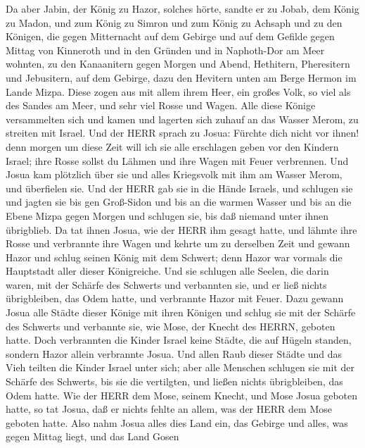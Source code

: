  Da aber Jabin, der König zu Hazor, solches hörte, sandte er
zu Jobab, dem König zu Madon, und zum König zu Simron und zum König zu
Achsaph  und zu den Königen, die gegen Mitternacht auf dem
Gebirge und auf dem Gefilde gegen Mittag von Kinneroth und in den
Gründen und in Naphoth-Dor am Meer wohnten,  zu den
Kanaanitern gegen Morgen und Abend, Hethitern, Pheresitern und
Jebusitern, auf dem Gebirge, dazu den Hevitern unten am Berge Hermon im
Lande Mizpa.  Diese zogen aus mit allem ihrem Heer, ein
großes Volk, so viel als des Sandes am Meer, und sehr viel Rosse und
Wagen.  Alle diese Könige versammelten sich und kamen und
lagerten sich zuhauf an das Wasser Merom, zu streiten mit Israel.
 Und der HERR sprach zu Josua: Fürchte dich nicht vor ihnen!
denn morgen um diese Zeit will ich sie alle erschlagen geben vor den
Kindern Israel; ihre Rosse sollst du Lähmen und ihre Wagen mit Feuer
verbrennen.  Und Josua kam plötzlich über sie und alles
Kriegsvolk mit ihm am Wasser Merom, und überfielen sie.  Und
der HERR gab sie in die Hände Israels, und schlugen sie und jagten sie
bis gen Groß-Sidon und bis an die warmen Wasser und bis an die Ebene
Mizpa gegen Morgen und schlugen sie, bis daß niemand unter ihnen
übrigblieb.  Da tat ihnen Josua, wie der HERR ihm gesagt
hatte, und lähmte ihre Rosse und verbrannte ihre Wagen  und
kehrte um zu derselben Zeit und gewann Hazor und schlug seinen König mit
dem Schwert; denn Hazor war vormals die Hauptstadt aller dieser
Königreiche.  Und sie schlugen alle Seelen, die darin
waren, mit der Schärfe des Schwerts und verbannten sie, und er ließ
nichts übrigbleiben, das Odem hatte, und verbrannte Hazor mit Feuer.
 Dazu gewann Josua alle Städte dieser Könige mit ihren
Königen und schlug sie mit der Schärfe des Schwerts und verbannte sie,
wie Mose, der Knecht des HERRN, geboten hatte.  Doch
verbrannten die Kinder Israel keine Städte, die auf Hügeln standen,
sondern Hazor allein verbrannte Josua.  Und allen Raub
dieser Städte und das Vieh teilten die Kinder Israel unter sich; aber
alle Menschen schlugen sie mit der Schärfe des Schwerts, bis sie die
vertilgten, und ließen nichts übrigbleiben, das Odem hatte.
 Wie der HERR dem Mose, seinem Knecht, und Mose Josua
geboten hatte, so tat Josua, daß er nichts fehlte an allem, was der HERR
dem Mose geboten hatte.  Also nahm Josua alles dies Land
ein, das Gebirge und alles, was gegen Mittag liegt, und das Land Gosen
